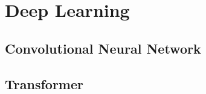 \section{Deep Learning}\label{sec:deep-learning}

\subsection{Convolutional Neural Network}\label{subsec:conv-neural-network}

\subsection{Transformer}\label{subsec:transformer}
